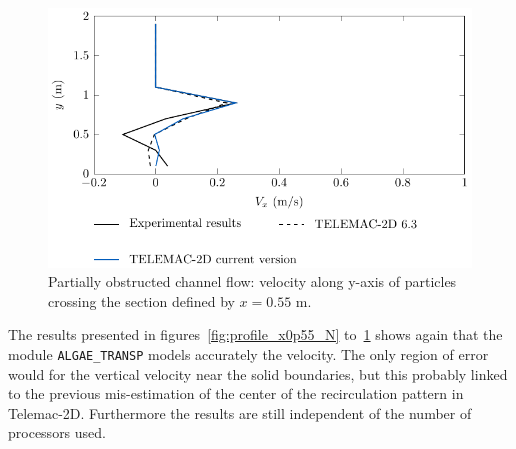 \begin{figure}[h!]%
\begin{center}
%
  \includegraphics[]{./Figures/CanalAlgProfile_x0p55_Vy}
%
\end{center}
\caption
{Partially obstructed channel flow: velocity along y-axis of particles crossing the section defined by $x=0.55$ m.}
\label{fig:profile_x0p55_V_Y}
\end{figure}

The results presented in figures~\ref{fig:profile_x0p55_N} to~\ref{fig:profile_x0p55_V_Y} shows again that the module
\texttt{ALGAE\_TRANSP} models accurately the velocity. The only region of error would for the vertical velocity near
the solid boundaries, but this probably linked to the previous mis-estimation of the center of the recirculation
pattern in Telemac-2D. Furthermore the results are still independent of the number of processors used.


